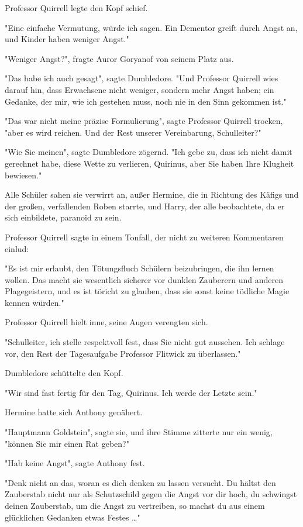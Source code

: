 {Professor Quirrell legte den Kopf schief.

"Eine einfache Vermutung, würde ich sagen. Ein Dementor greift durch Angst an, und Kinder haben weniger Angst."

"Weniger Angst?", fragte Auror Goryanof von seinem Platz aus.

"Das habe ich auch gesagt", sagte Dumbledore. "Und Professor Quirrell wies darauf hin, dass Erwachsene nicht weniger, sondern mehr Angst haben; ein Gedanke, der mir, wie ich gestehen muss, noch nie in den Sinn gekommen ist."

"Das war nicht meine präzise Formulierung", sagte Professor Quirrell trocken, "aber es wird reichen. Und der Rest unserer Vereinbarung, Schulleiter?"

"Wie Sie meinen", sagte Dumbledore zögernd. "Ich gebe zu, dass ich nicht damit gerechnet habe, diese Wette zu verlieren, Quirinus, aber Sie haben Ihre Klugheit bewiesen."

Alle Schüler sahen sie verwirrt an, außer Hermine, die in Richtung des Käfigs und der großen, verfallenden Roben starrte, und Harry, der alle beobachtete, da er sich einbildete, paranoid zu sein.

Professor Quirrell sagte in einem Tonfall, der nicht zu weiteren Kommentaren einlud:

"Es ist mir erlaubt, den Tötungsfluch Schülern beizubringen, die ihn lernen wollen. Das macht sie wesentlich sicherer vor dunklen Zauberern und anderen Plagegeistern, und es ist töricht zu glauben, dass sie sonst keine tödliche Magie kennen würden."

Professor Quirrell hielt inne, seine Augen verengten sich.

"Schulleiter, ich stelle respektvoll fest, dass Sie nicht gut aussehen. Ich schlage vor, den Rest der Tagesaufgabe Professor Flitwick zu überlassen."

Dumbledore schüttelte den Kopf.

"Wir sind fast fertig für den Tag, Quirinus. Ich werde der Letzte sein."

Hermine hatte sich Anthony genähert.

"Hauptmann Goldstein", sagte sie, und ihre Stimme zitterte nur ein wenig, "können Sie mir einen Rat geben?"

"Hab keine Angst", sagte Anthony fest.

"Denk nicht an das, woran es dich denken zu lassen versucht. Du hältst den Zauberstab nicht nur als Schutzschild gegen die Angst vor dir hoch, du schwingst deinen Zauberstab, um die Angst zu vertreiben, so machst du aus einem glücklichen Gedanken etwas Festes …"

}
